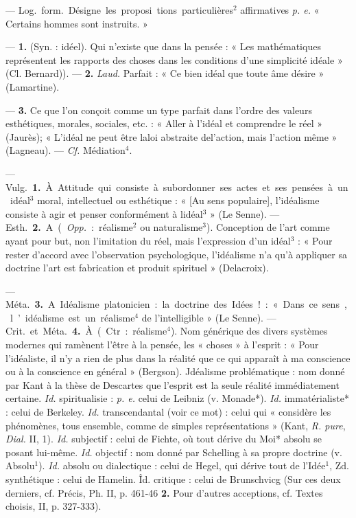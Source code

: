 
	\begin{itemize}[leftmargin=1cm, label=, itemsep=1pt]

 — \si{Log.} \si{form.} Désigne les proposi
tions particulières$^2$ affirmatives
{\it p. e.} « Certains hommes sont instruits. »

 — {\bf 1.} (Syn. : idéel). Qui
n'existe que dans la pensée : « Les
mathématiques représentent les rapports des choses dans les conditions
d'une simplicité idéale » (Cl. Bernard)). — {\bf 2.} {\it Laud.} Parfait : « Ce bien
idéal que toute âme désire » (Lamartine).

 — {\bf 3.} Ce que l’on conçoit
comme un type parfait dans l’ordre
des valeurs esthétiques, morales, sociales, etc. : « Aller à l'idéal et comprendre le réel » (Jaurès); « L'idéal
ne peut être laloi abstraite del’action,
mais l’action même » (Lagneau). —
{\it {\it Cf.}} Médiation$^4$.

 — \si{Vulg.} {\bf 1.} À Attitude qui
consiste à subordonner ses actes et
ses pensées à un idéal$^3$ moral, intellectuel ou esthétique : « [Au sens
populaire], l’idéalisme consiste à
agir et penser conformément à
lidéal$^3$ » (Le Senne). — \si{Esth.} {\bf 2.} A
({\it Opp.} : réalisme$^2$ ou naturalisme$^3$).
Conception de l’art comme ayant
pour but, non l’imitation du réel,
mais l'expression d’un idéal$^3$ : « Pour
rester d'accord avec l'observation
psychologique, l’idéalisme n’a qu’à
appliquer sa doctrine l’art est
fabrication et produit spirituel »
(Delacroix).

— \si{Méta.} {\bf 3.} A. Idéalisme platonicien : la doctrine des Idées! :
« Dans ce sens, l’idéalisme est un
réalisme$^4$ de l’intelligible » (Le
Senne). — \si{Crit.} et \si{Méta.} {\bf 4.} À.
(Ctr. : réalisme$^4$). Nom générique
des divers systèmes modernes qui
ramènent l'être à la pensée, les
« choses » à l'esprit : « Pour l’idéaliste, il n’y a rien de plus dans la
réalité que ce qui apparaît à ma
conscience ou à la conscience en
général » (Bergson). Jdéalisme problématique : nom donné par Kant
à la thèse de Descartes que l'esprit
est la seule réalité immédiatement
certaine. {\it Id.} spiritualisie : {\it p. e.} celui
de Leibniz (v. Monade*). {\it Id.} immatérialiste* : celui de Berkeley. {\it Id.}
transcendantal (voir ce mot) : celui
qui « considère les phénomènes, tous
ensemble, comme de simples représentations » (Kant, {\it R. pure}, {\it Dial.}
II, 1). {\it Id.} subjectif : celui de Fichte,
où tout dérive du Moi* absolu se
posant lui-même. {\it Id.} objectif : nom
donné par Schelling à sa propre doctrine (v. Absolu$^1$). {\it Id.} absolu ou dialectique : celui de Hegel, qui dérive
tout de l’Idée$^1$, Zd. synthétique : celui
de Hamelin. Îd. critique : celui de
Brunschvicg (Sur ces deux derniers,
cf. Précis, Ph. II, p. 461-46 {\bf 2.} Pour
d’autres acceptions, cf. Textes choisis, II, p. 327-333).


\end{itemize}
